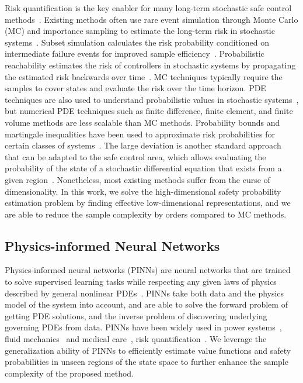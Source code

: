 \documentclass[letterpaper]{article} %
\begin{document}
Risk quantification is the key enabler for many long-term stochastic safe control methods~\cite{wang2021myopically,jing2022probabilistic}.
Existing methods often use rare event simulation through Monte Carlo (MC) and importance sampling to estimate the long-term risk in stochastic systems~\cite{ botev2013markov,hanna2021importance,stadie2018some,madhushani2020hamiltonian}. Subset simulation calculates the risk probability conditioned on intermediate failure events for improved sample efficiency~\cite{huang2016assessing, zhao2022subset, rashki2021sesc}. Probabilistic reachability estimates the risk of controllers in stochastic systems by propagating the estimated risk backwards over time~\cite{hewing2018stochastic,bansal2020hamilton,huh2020safe}. MC techniques typically require the samples to cover states and evaluate the risk over the time horizon.
PDE techniques are also used to understand probabilistic values in stochastic systems~\cite{chern2021safe,feng2014comparative}, but numerical PDE techniques such as finite difference, finite element, and finite volume methods are less scalable than MC methods.
Probability bounds and martingale inequalities have been used to approximate risk probabilities for certain classes of systems~\cite{clark2019control,yaghoubi2020risk,santoyo2021barrier,cheng2020safe, meng2022sufficient, nishimura2023control}.
The large deviation is another standard approach that can be adapted to the safe control area, which allows evaluating the probability of the state of a stochastic differential equation that exists from a given region~\cite{bressloff2014path,bertini2015large}.
Nonetheless, most existing methods suffer from the curse of dimensionality. In this work, we solve the high-dimensional safety probability estimation problem by finding effective low-dimensional representations, and we are able to reduce the sample complexity by orders compared to MC methods.



\subsection{Physics-informed Neural Networks}
Physics-informed neural networks (PINNs) are neural networks that are trained to solve supervised learning tasks while respecting any given laws of physics described by general nonlinear PDEs~\citep{raissi2019physics}. PINNs take both data and the physics model of the system into account, and are able to solve the forward problem of getting PDE solutions, and the inverse problem of discovering underlying governing PDEs from data. PINNs have been widely used in power systems~\cite{misyris2020physics}, fluid mechanics~\cite{cai2022physics} and medical care~\cite{sahli2020physics}, risk quantification~\cite{han2018solving, pereira2021safe, wang2023generalizable}. We leverage the generalization ability of PINNs to efficiently estimate value functions and safety probabilities in unseen regions of the state space to further enhance the sample complexity of the proposed method.
\end{document}
